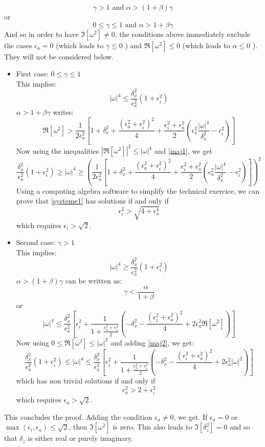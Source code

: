 \[
\gamma>1 \mbox{ and }\alpha > (1 + \beta ) \gamma
\]
or
\[
0\le \gamma\le 1 \mbox{ and }\alpha > 1 + \beta \gamma
\]
And so in order to have $\Im[\omega^2]\ne 0$, the conditions above immediately exclude the cases $\epsilon_a=0$ (which leads to $\gamma \le 0$ ) and $\Re[\omega^2] \le 0$ (which leads to $\alpha \le 0$ ). They will not be considered below.
\begin{itemize}
	\item First case: $0\le \gamma \le 1$\\
	This implies:
	\begin{equation}
	|\omega|^4 \le \frac{\delta_x^2}{\epsilon_a^2}(1+\epsilon_i^2)
	\label{maj1}
	\end{equation}
	$\alpha > 1 + \beta \gamma$ writes:
	\[
	\Re[\omega^2] > \frac{1}{2\epsilon_a^2}\left[
	1+\delta_x^2+\frac{(\epsilon_a^2+\epsilon_i^2)^2}{4}
	+\frac{\epsilon_i^2+\epsilon_a^2}{2}\left(
	\epsilon_a^2\frac{|\omega|^4}{\delta_x^2} -\epsilon_i^2
	\right)
	\right]
	\]
	Now using the inequalities $|\Re[\omega^2]|^2 \le |\omega|^4$ and \ref{maj1}, we get
	\begin{equation}
	\frac{\delta_x^2}{\epsilon_a^2}(1+\epsilon_i^2)
	\ge
	|\omega|^4
	\ge 
	\left(
	\frac{1}{2\epsilon_a^2}\left[
	1+\delta_x^2+\frac{(\epsilon_a^2+\epsilon_i^2)^2}{4}
	+\frac{\epsilon_i^2+\epsilon_a^2}{2}\left(
	\epsilon_a^2\frac{|\omega|^4}{\delta_x^2} -\epsilon_i^2
	\right)
	\right]
	\right)^2
	\label{systeme1}
	\end{equation}
	Using a computing algebra software to simplify the technical exercice, we can prove that \ref{systeme1} has solutions if and only if
	\[
	\epsilon_i^2 > \sqrt{4+\epsilon_a^4}
	\]
	which requires $\epsilon_i > \sqrt{2}$.
	\item Second case: $\gamma > 1$\\
	This implies:
	\begin{equation}
	|\omega|^4 \ge \frac{\delta_x^2}{\epsilon_a^2}(1+\epsilon_i^2)
	\label{maj2}
	\end{equation}
	$\alpha > (1 + \beta ) \gamma$ can be written as:
	\[
	\gamma < \frac{\alpha}{1+\beta}
	\]
	or
	\[
	|\omega|^4 \le \frac{\delta_x^2}{\epsilon_a^2}\left[
	\epsilon_i^2
	+\frac{1}{1+\frac{\epsilon_a^2+\epsilon_i^2}{2}}
	\left(
	-\delta_x^2-\frac{(\epsilon_i^2+\epsilon_a^2)^2}{4}+2\epsilon_a^2\Re[\omega^2]
	\right)
	\right]
	\]
	Now using $0 \le \Re[\omega^2] \le |\omega|^2$ and adding \ref{maj2}, we get:
	\[
	\frac{\delta_x^2}{\epsilon_a^2}(1+\epsilon_i^2)
	\le
	|\omega|^4 \le \frac{\delta_x^2}{\epsilon_a^2}\left[
	\epsilon_i^2
	+\frac{1}{1+\frac{\epsilon_a^2+\epsilon_i^2}{2}}
	\left(
	-\delta_x^2-\frac{(\epsilon_i^2+\epsilon_a^2)^2}{4}+2\epsilon_a^2|\omega|^2
	\right)
	\right]
	\]
	which has non trivial solutions if and only if
	\[
	\epsilon_a^2 > 2+ \epsilon_i^2
	\]
	which requires $\epsilon_a > \sqrt{2}$.
\end{itemize}
This concludes the proof. Adding the condition $\epsilon_a \ne 0$, we get. If $\epsilon_a=0$ or $\max(\epsilon_i,\epsilon_a)\le \sqrt{2}$, then $\Im[\omega^2]$ is zero. This also leads to $\Im[\delta_z^2]=0$ and so that $\delta_z$ is either real or purely imaginary.
